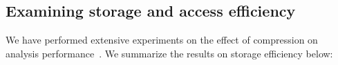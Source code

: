 \documentclass{acm_proc_article-sp}
\begin{document}
\subsection{Examining storage and access efficiency}\label{sec:efficiency}

We have performed extensive experiments on the effect 
of compression
on analysis performance~\cite{DSTechnicalReportSnapshot}.  We
summarize the results on storage efficiency below:
\end{document}
